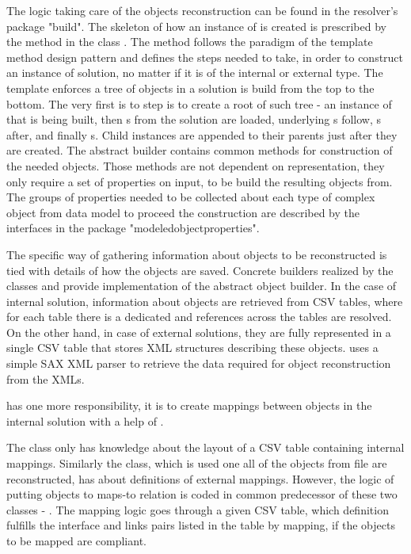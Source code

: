 The logic taking care of the objects reconstruction can be found in the resolver's package "build".
The skeleton of how an instance of  is created is prescribed by the method  in the class . The method follows the paradigm of the template method design pattern and defines the steps needed to take, in order to construct an instance of  solution, no matter if it is of the internal or external type.
The template enforces a tree of objects in a solution is build from the top to the bottom.
The very first is to step is to create a root of such tree - an instance of  that is being built, then s from the solution are loaded, underlying s follow, s after, and finally s. 
Child instances are appended to their parents just after they are created.
The abstract builder contains common methods for construction of the needed objects. 
Those methods are not dependent on representation, they only require a set of properties on input, to be build the resulting objects from. 
The groups of properties needed to be collected about each type of complex object from data model to proceed the construction are described by the interfaces in the package "modeledobjectproperties".

The specific way of gathering information about objects to be reconstructed is tied with details of how the objects are saved. 
Concrete builders realized by the classes  and  provide implementation of the abstract object builder.
In the case of internal solution, information about objects are retrieved from CSV tables, where for each table there is a dedicated and references across the tables are resolved.
On the other hand, in case of external solutions, they are fully represented in a single CSV table that stores XML structures describing these objects. 
 uses a simple SAX XML parser to retrieve the data required for object reconstruction from the XMLs.

 has one more responsibility, it is to create mappings between  objects in the internal solution with a help of . 

The  class only has knowledge about the layout of a CSV table containing internal mappings. Similarly the  class, which is used one all of the objects from file are reconstructed, has about definitions of external mappings. 
However, the logic of putting objects to maps-to relation is coded in common predecessor of these two classes - .
The mapping logic goes through a given CSV table, which definition fulfills the interface  and links pairs listed in the table by mapping, if the objects to be mapped are compliant.


